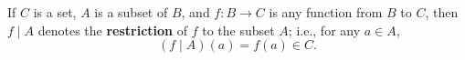 If $C$ is a set, $A$ is a subset of $B$, and $f \colon B \to C$ is any function from $B$ to $C$, then $f \mid A$ denotes the \textbf{restriction} of $f$ to the subset $A$; i.e., for any $a \in A$,
$$
(f \mid A)(a) = f(a) \in C.
$$
